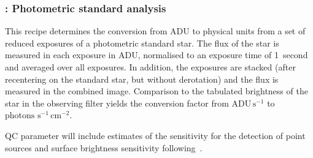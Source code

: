 %
%
%

\subsubsection{:  Photometric standard analysis}
\label{lm_img_photstd}
\label{rec:lm_img_photstd}
\label{sssec:lm_img_photstd}
\label{rec:metis_lm_img_std_process}

This recipe determines the conversion from ADU to physical units from
a set of reduced exposures of a photometric standard star. The flux of
the star is measured in each exposure in ADU, normalised to an
exposure time of 1~second and averaged over all exposures. In
addition, the exposures are stacked (after recentering on the standard
star, but without derotation) and the flux is measured in the combined
image. Comparison to the tabulated brightness of the star in the
observing filter yields the conversion factor from
$\mathrm{ADU\,s^{-1}}$ to $\mathrm{photons\,\,s^{-1}\,cm^{-2}}$.

QC parameter will include estimates of the sensitivity for the
detection of point sources and surface brightness sensitivity
following~\cite{visir_manual}.

